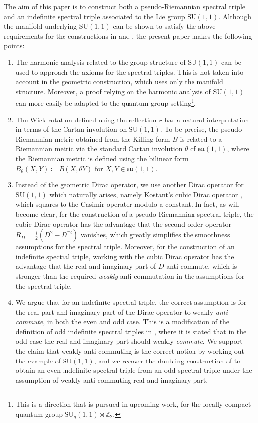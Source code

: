 \documentclass{amsart}
\theoremstyle{definition}
\theoremstyle{remark}
\numberwithin{equation}{section}
\begin{document}
The aim of this paper is to construct both a pseudo-Riemannian spectral triple and an indefinite spectral triple associated to the Lie group $\mathrm{SU}(1,1)$. Although the manifold underlying $\mathrm{SU}(1,1)$ can be shown to satisfy the above requirements for the constructions in \cite{dungen_paschke_rennie_2013} and \cite{dungen_rennie_2016,dungen_2019}, the present paper makes the following points:
\begin{enumerate}
    \item[1)] The harmonic analysis related to the group structure of $\mathrm{SU}(1,1)$ can be used to approach the axioms for the spectral triples. This is not taken into account in the geometric construction, which uses only the manifold structure. Moreover, a proof relying on the harmonic analysis of $\mathrm{SU}(1,1)$ can more easily be adapted to the quantum group setting\footnote{This is a direction that is pursued in upcoming work, for the locally compact quantum group $\mathrm{SU}_q(1,1)\rtimes\mathbb{Z}_2$.}.
    \item[2)] The Wick rotation defined using the reflection $r$ has a natural interpretation in terms of the Cartan involution on $\mathrm{SU}(1,1)$. To be precise, the pseudo-Riemannian metric obtained from the Killing form $B$ is related to a Riemannian metric via the standard Cartan involution $\theta$ of $\mathfrak{su}(1,1)$, where the Riemannian metric is defined using the bilinear form $B_\theta(X,Y)\coloneq B(X,\theta Y)$ for $X,Y\in\mathfrak{su}(1,1)$.
    \item[3)] Instead of the geometric Dirac operator, we use another Dirac operator for $\mathrm{SU}(1,1)$ which naturally arises, namely Kostant's cubic Dirac operator \cite{kostant_1999}, which squares to the Casimir operator modulo a constant. In fact, as will become clear, for the construction of a pseudo-Riemannian spectral triple, the cubic Dirac operator has the advantage that the second-order operator $R_D=\tfrac{i}{2}(D^2-D^{*2})$ vanishes, which greatly simplifies the smoothness assumptions for the spectral triple. Moreover, for the construction of an indefinite spectral triple, working with the cubic Dirac operator has the advantage that the real and imaginary part of $D$ anti-commute, which is stronger than the required \emph{weakly} anti-commutation in the assumptions for the spectral triple.
    \item[4)] We argue that for an indefinite spectral triple, the correct assumption is for the real part and imaginary part of the Dirac operator to weakly \emph{anti-commute}, in both the even and odd case. This is a modification of the definition of odd indefinite spectral triples in \cite{dungen_rennie_2016}, where it is stated that in the odd case the real and imaginary part should weakly \emph{commute}. We support the claim that weakly anti-commuting is the correct notion by working out the example of $\mathrm{SU}(1,1)$, and we recover the doubling construction of \cite{dungen_rennie_2016} to obtain an even indefinite spectral triple from an odd spectral triple under the assumption of weakly anti-commuting real and imaginary part.
\end{enumerate}
\end{document}
